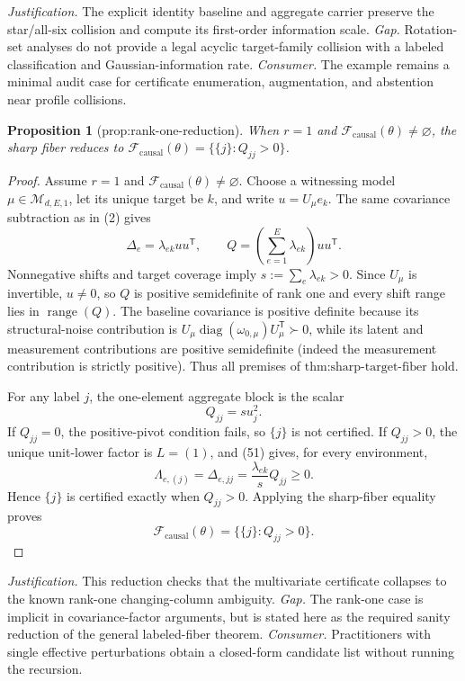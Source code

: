 \documentclass{article}
\newtheorem{proposition}{Proposition}
\begin{document}
\par\smallskip\noindent \textit{Justification.} The explicit identity baseline and aggregate carrier preserve the star/all-six collision and compute its first-order information scale. \textit{Gap.} Rotation-set analyses do not provide a legal acyclic target-family collision with a labeled classification and Gaussian-information rate. \textit{Consumer.} The example remains a minimal audit case for certificate enumeration, augmentation, and abstention near profile collisions.

\begin{proposition}[prop:rank-one-reduction]\label{prop:rank-one-reduction}
When \(r=1\) and \(\mathcal F_{\mathrm{causal}}(\theta)\ne\varnothing\), the sharp fiber reduces to \(\mathcal F_{\mathrm{causal}}(\theta)=\{\{j\}:Q_{jj}>0\}\).
\end{proposition}
\begin{proof}
Assume \(r=1\) and \(\mathcal F_{\mathrm{causal}}(\theta)\ne\varnothing\).  Choose a witnessing model \(\mu\in\mathcal M_{d,E,1}\), let its unique target be \(k\), and write \(u=U_\mu e_k\).  The same covariance subtraction as in (2) gives
\[
 \Delta_e=\lambda_{ek}uu^{\mathsf T},
 \qquad
 Q=\left(\sum_{e=1}^E\lambda_{ek}\right)uu^{\mathsf T}. \tag{51}
\]
Nonnegative shifts and target coverage imply
\(s:=\sum_e\lambda_{ek}>0\).  Since \(U_\mu\) is invertible, \(u\ne0\), so \(Q\) is positive semidefinite of rank one and every shift range lies in \(\operatorname{range}(Q)\).  The baseline covariance is positive definite because its structural-noise contribution is \(U_\mu\operatorname{diag}(\omega_{0,\mu})U_\mu^{\mathsf T}\succ0\), while its latent and measurement contributions are positive semidefinite (indeed the measurement contribution is strictly positive).  Thus all premises of \(\text{thm:sharp-target-fiber}\) hold.

For any label \(j\), the one-element aggregate block is the scalar
\[
 Q_{jj}=s u_j^2.
\]
If \(Q_{jj}=0\), the positive-pivot condition fails, so \(\{j\}\) is not certified.  If \(Q_{jj}>0\), the unique unit-lower factor is \(L=(1)\), and (51) gives, for every environment,
\[
 \Lambda_{e,(j)}=\Delta_{e,jj}
 =\frac{\lambda_{ek}}{s}Q_{jj}\ge0. \tag{52}
\]
Hence \(\{j\}\) is certified exactly when \(Q_{jj}>0\).  Applying the sharp-fiber equality proves
\[
 \mathcal F_{\mathrm{causal}}(\theta)=\{\{j\}:Q_{jj}>0\}.
\]
\end{proof}
\par\smallskip\noindent \textit{Justification.} This reduction checks that the multivariate certificate collapses to the known rank-one changing-column ambiguity. \textit{Gap.} The rank-one case is implicit in covariance-factor arguments, but is stated here as the required sanity reduction of the general labeled-fiber theorem. \textit{Consumer.} Practitioners with single effective perturbations obtain a closed-form candidate list without running the recursion.
\end{document}
